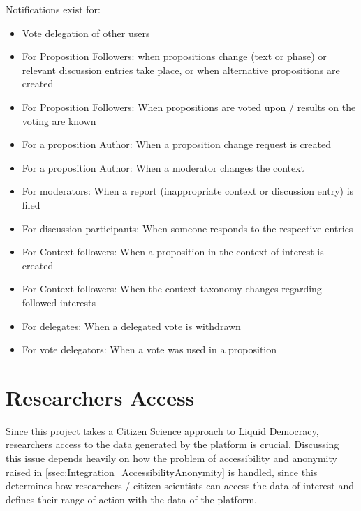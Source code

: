 Notifications exist for:
\begin{itemize}
\item Vote delegation of other users 
\item For Proposition Followers: when propositions change (text or phase) or relevant discussion entries take place, or when alternative propositions are created
\item For Proposition Followers: When propositions are voted upon / results on the voting are known
\item For a proposition Author: When a proposition change request is created
\item For a proposition Author: When a moderator changes the context
\item For moderators: When a report (inappropriate context or discussion entry) is filed
\item For discussion participants: When someone responds to the respective entries
\item For Context followers: When a proposition in the context of interest is created
\item For Context followers: When the context taxonomy changes regarding followed interests
\item For delegates: When a delegated vote is withdrawn
\item For vote delegators: When a vote was used in a proposition 
\end{itemize}

\section{Researchers Access}
\label{sec:Model_ResearchersAccess}
% 
% 
% 
Since this project takes a Citizen Science approach to Liquid Democracy, researchers access to the data generated by the platform is crucial. Discussing this issue depends heavily on how the problem of accessibility and anonymity raised in \ref{ssec:Integration_AccessibilityAnonymity} is handled, since this determines how researchers / citizen scientists can access the data of interest and defines their range of action with the data of the platform. 

